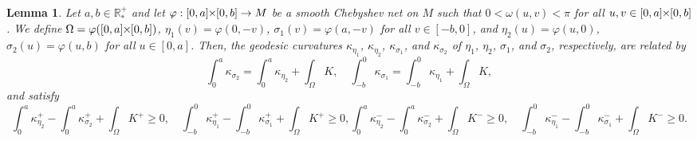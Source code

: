 \documentclass{article}
\newcommand{\PLH}{{\mkern-1mu\times\mkern-1mu}}
\newcommand{\Times}{\PLH}
\newcommand{\R}{\mathbb{R}}
\newcommand{\surf}{M}
\newcommand{\ko}{\kappa}
\newtheorem{lemma}[theorem]{Lemma}
\theoremstyle{remark}
\theoremstyle{prpart}
\begin{document}
\begin{lemma}  \label{lem:geod-curv}
  Let $a,b\in\R_\ast^+$ and let $\varphi:[0,a]\Times[0,b]\to \surf$ be a smooth Chebyshev net on $\surf$ such that $0<\omega(u,v)<\pi$ for all $u,v\in[0,a]\Times[0,b]$. We define $\Omega = \varphi([0,a]\Times[0,b])$, $\eta_1(v)=\varphi(0,-v)$, $\sigma_1(v) = \varphi(a,-v)$ for all $v\in[-b,0]$, and $\eta_2(u) = \varphi(u,0)$, $\sigma_2(u) = \varphi(u,b)$ for all $u\in [0,a]$. Then, the geodesic curvatures $\ko_{\eta_1}$, $\ko_{\eta_2}$, $\ko_{\sigma_1}$, and $\ko_{\sigma_2}$ of $\eta_1$, $\eta_2$, $\sigma_1$, and $\sigma_2$, respectively, are related by
  \begin{equation}    \label{eq:geod-curv-c4}
    \int_0^a{\ko_{\sigma_2}} = \int_0^a{\ko_{\eta_2}} + \int_{\Omega}{K},\quad\int_{-b}^0{\ko_{\sigma_1}} = \int_{-b}^0{\ko_{\eta_1}} + \int_{\Omega}{K},
  \end{equation}
  and satisfy
  \begin{subequations} \label{eq:ineq-geod}
    \begin{equation} \label{eq:ineq-geod:1}
      \int_0^a{\ko_{\eta_2}^+} - \int_0^a{\ko_{\sigma_2}^+} + \int_{\Omega}{K^+}  \geq 0,\quad
      \int_{-b}^0{\ko_{\eta_1}^+} - \int_{-b}^0{\ko_{\sigma_1}^+} + \int_{\Omega}{K^+}  \geq 0,
    \end{equation}
    \begin{equation}\label{eq:ineq-geod:2}
      \int_0^a{\ko_{\eta_2}^-} - \int_0^a{\ko_{\sigma_2}^-} + \int_{\Omega}{K^-}  \geq 0,\quad \int_{-b}^0{\ko_{\eta_1}^-} - \int_{-b}^0{\ko_{\sigma_1}^-} + \int_{\Omega}{K^-}  \geq 0.
    \end{equation}
  \end{subequations}
\end{lemma}
\end{document}
